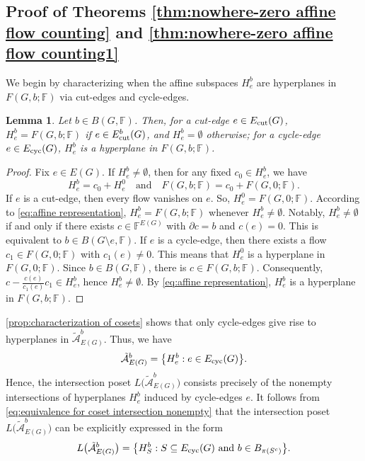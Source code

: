 \documentclass[12pt]{article}%
\renewcommand*{\bm}[1]{#1}%
\numberwithin{equation}{section}
\def\And{\mbox{\rm ~and~}}
\newtheorem{lemma}[lemma]{Lemma}
\begin{document}
\subsection{Proof of Theorems \ref{thm:nowhere-zero affine flow counting} and \ref{thm:nowhere-zero affine flow counting1} }\label{Sec3-1}
We begin by characterizing when the affine subspaces $H_e^{\bm b}$ are hyperplanes in $F(G,\bm b;\mathbb{F})$ via cut-edges and cycle-edges.
\begin{lemma}\label{prop:characterization of cosets}
Let $\bm b\in B(G,\mathbb{F})$. Then, for a cut-edge $e\in E_{\rm cut}(G)$, $H_e^{\bm b}=F(G,\bm b;\mathbb{F})$ if $e\in E_{\rm cut}^{\bm b}(G)$, and $H_e^{\bm b}=\emptyset$ otherwise; for a cycle-edge $e\in E_{\rm cyc}(G)$, $H_e^{\bm b}$ is a hyperplane in $F(G,\bm b;\mathbb{F})$.
\end{lemma}
\begin{proof}
Fix $e\in E(G)$. If $H_e^{\bm b}\ne\emptyset$, then for any fixed $\bm c_0\in H_e^{\bm b}$,  we have
\begin{equation}\label{eq:affine representation}
H_e^{\bm b}=\bm c_0+H_e^{\bm 0}\quad\text{and}\quad F(G,\bm b;\mathbb{F})=\bm c_0+F(G,\bm 0;\mathbb{F}).
\end{equation}
If $e$ is a cut-edge, then every flow vanishes on $e$. So, $H_e^{\bm 0}=F(G,\bm 0;\mathbb{F})$. According to \eqref{eq:affine representation}, $H_e^{\bm b}=F(G,\bm b;\mathbb{F})$ whenever $H_e^{\bm b}\ne\emptyset$. Notably, $H_e^{\bm b}\ne\emptyset$ if and only if there exists $\bm c\in \mathbb{F}^{E(G)}$ with $\partial\bm c=\bm b$ and $\bm c(e)=0$. This is equivalent to $\bm b\in B(G\setminus e,\mathbb{F})$. If $e$ is a cycle-edge, then there exists a flow $\bm c_1\in F(G,\bm 0;\mathbb{F})$ with $\bm c_1(e)\ne 0$. This means that $H_e^{\bm 0}$ is a hyperplane in $F(G,\bm 0;\mathbb{F})$. Since $\bm b\in B(G,\mathbb{F})$, there is $\bm c\in F(G,\bm b;\mathbb{F})$. Consequently,  $\bm c-\frac{\bm c(e)}{\bm c_1(e)}\bm c_1\in H_e^{\bm b}$, hence $H_e^{\bm b}\ne\emptyset$. By \eqref{eq:affine representation}, $H_e^{\bm b}$ is a hyperplane in $F(G,\bm b;\mathbb{F})$.
\end{proof}
\autoref{prop:characterization of cosets} shows that only cycle-edges give rise to hyperplanes in  $\tilde{\mathcal{A}}_{E(G)}^{\bm b}$. Thus, we have
\[
\tilde{\mathcal{A}}_{E(G)}^{\bm b}=\big\{H_e^{\bm b}: e\in E_{\rm cyc}(G)\big\}.
\]
Hence, the intersection poset $L\big(\tilde{\mathcal{A}}_{E(G)}^{\bm b}\big)$ consists precisely of the nonempty intersections of hyperplanes $H_e^{\bm b}$ induced by cycle-edges $e$. It follows from \eqref{eq:equivalence for coset intersection nonempty} that  the intersection poset $L\big(\tilde{\mathcal{A}}_{E(G)}^{\bm b}\big)$ can be explicitly expressed in the form
\[
L\big(\tilde{\mathcal{A}}_{E(G)}^{\bm b}\big)=\big\{H_S^{\bm b}: S\subseteq E_{\rm cyc}(G)\And \bm b\in B_{\pi(S^c)}\big\}.
\] 
\end{document}
